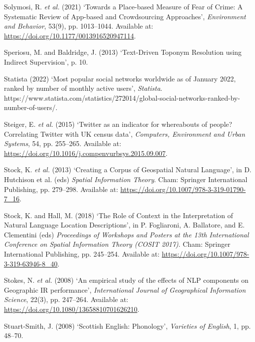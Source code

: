 \documentclass[
  letterpaper,
  11pt,
  english,
  onehalfspacing,
  headsepline]{MastersDoctoralThesis}
\newlength{\cslhangindent}
\newlength{\cslentryspacingunit} %
\newenvironment{CSLReferences}[2] %
 {%
  \setlength{\parindent}{0pt}
  \ifodd #1
  \let\oldpar\par
  \def\par{\hangindent=\cslhangindent\oldpar}
  \fi
  \setlength{\parskip}{#2\cslentryspacingunit}
 }%
 {}
\begin{document}
\begin{CSLReferences}{0}{0}
\leavevmode{}%
Solymosi, R. \emph{et al.} (2021) {`Towards a {Place-based Measure} of
{Fear} of {Crime}: {A Systematic Review} of {App-based} and
{Crowdsourcing Approaches}'}, \emph{Environment and Behavior}, 53(9),
pp. 1013--1044. Available at:
\url{https://doi.org/10.1177/0013916520947114}.

\leavevmode{}%
Speriosu, M. and Baldridge, J. (2013) {`Text-{Driven Toponym Resolution}
using {Indirect Supervision}'}, p. 10.

\leavevmode{}%
Statista (2022) {`Most popular social networks worldwide as of {January}
2022, ranked by number of monthly active users'}, \emph{Statista}.
https://www.statista.com/statistics/272014/global-social-networks-ranked-by-number-of-users/.

\leavevmode{}%
Steiger, E. \emph{et al.} (2015) {`Twitter as an indicator for
whereabouts of people? {Correlating Twitter} with {UK} census data'},
\emph{Computers, Environment and Urban Systems}, 54, pp. 255--265.
Available at: \url{https://doi.org/10.1016/j.compenvurbsys.2015.09.007}.

\leavevmode{}%
Stock, K. \emph{et al.} (2013) {`Creating a {Corpus} of {Geospatial
Natural Language}'}, in D. Hutchison et al. (eds) \emph{Spatial
{Information Theory}}. {Cham}: {Springer International Publishing}, pp.
279--298. Available at:
\url{https://doi.org/10.1007/978-3-319-01790-7_16}.

\leavevmode{}%
Stock, K. and Hall, M. (2018) {`The {Role} of {Context} in the
{Interpretation} of {Natural Language Location Descriptions}'}, in P.
Fogliaroni, A. Ballatore, and E. Clementini (eds) \emph{Proceedings of
{Workshops} and {Posters} at the 13th {International Conference} on
{Spatial Information Theory} ({COSIT} 2017)}. {Cham}: {Springer
International Publishing}, pp. 245--254. Available at:
\url{https://doi.org/10.1007/978-3-319-63946-8_40}.

\leavevmode{}%
Stokes, N. \emph{et al.} (2008) {`An empirical study of the effects of
{NLP} components on {Geographic IR} performance'}, \emph{International
Journal of Geographical Information Science}, 22(3), pp. 247--264.
Available at: \url{https://doi.org/10.1080/13658810701626210}.

\leavevmode{}%
Stuart-Smith, J. (2008) {`Scottish {English}: {Phonology}'},
\emph{Varieties of English}, 1, pp. 48--70.


\end{CSLReferences}
\end{document}
